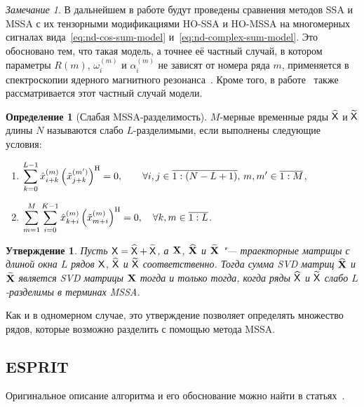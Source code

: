 \documentclass[specialist,
  substylefile=spbu_report.rtx,
subf,href,colorlinks=true, 12pt]{disser}
\theoremstyle{plain}
\newtheorem{statement}{Утверждение}[section]
\theoremstyle{definition}
\newtheorem{definition}{Определение}[section]
\theoremstyle{remark}
\newtheorem{remark}{Замечание}[section]
\begin{document}
\begin{remark}\label{remark:model-justification}
  В дальнейшем в работе будут проведены сравнения методов SSA и MSSA
  с их тензорными модификациями
  HO-SSA и HO-MSSA на многомерных сигналах вида~\eqref{eq:nd-cos-sum-model}
  и~\eqref{eq:nd-complex-sum-model}.
  Это обосновано тем, что такая модель, а точнее её частный случай, в
  котором параметры $R(m)$, $\omega_i^{(m)}$
  и $\alpha_i^{(m)}$ не зависят от номера ряда $m$, применяется в
  спектроскопии ядерного магнитного
  резонанса~\cite{NMR}.
  Кроме того, в работе~\cite{hosvd-hooi-separation} также
  рассматривается этот частный случай модели.
\end{remark}

\begin{definition}[Слабая MSSA-разделимость]
  \label{def:mssa-separability}
  $M$-мерные временные ряды $\widehat{\mathsf{X}}$ и $\widetilde{\mathsf{X}}$ длины
  $N$ называются слабо $L$-разделимыми, если
  выполнены следующие условия:
  \begin{enumerate}
    \item $\displaystyle \sum_{k=0}^{L-1}
      \hat{x}_{i+k}^{(m)}\left(\tilde{x}_{j+k}^{(m')}\right)^{\mathrm{H}} = 0,
      \qquad \forall i, j \in \overline{1:(N-L+1)},\, m, m' \in
      \overline{1:M}$,
    \item $\displaystyle \sum_{m=1}^{M} \sum_{i=0}^{K-1}
      \hat{x}_{k+i}^{(m)} \left(\tilde{x}_{m+i}^{(m)}\right)^{\mathrm{H}} = 0, \quad
      \forall k, m \in \overline{1:L}$.
  \end{enumerate}
\end{definition}

\begin{statement}
  \label{state:mssa-separability}
  Пусть $\mathsf{X} = \widehat{\mathsf{X}} + \widetilde{\mathsf{X}}$, а $\mathbf{X}$,
  $\widehat{\mathbf{X}}$ и $\widetilde{\mathbf{X}}$ "--- траекторные
  матрицы с длиной окна $L$ рядов $\mathsf{X}$, $\widehat{\mathsf{X}}$ и
  $\widetilde{\mathsf{X}}$ соответственно.
  Тогда сумма \emph{SVD} матриц $\widehat{\mathbf{X}}$ и $\widetilde{\mathbf{X}}$
  является \emph{SVD} матрицы $\mathbf{X}$ тогда и только тогда, когда
  ряды $\widehat{\mathsf{X}}$ и $\widetilde{\mathsf{X}}$ слабо $L$-разделимы в
  терминах MSSA.
\end{statement}
Как и в одномерном случае, это утверждение позволяет определять
множество рядов, которые возможно разделить с
помощью метода MSSA.

\subsection{ESPRIT}\label{subsec:esprit}
Оригинальное описание алгоритма и его обоснование
можно найти в статьях~\cite{esprit,hosvd-hooi-separation}.
\end{document}
